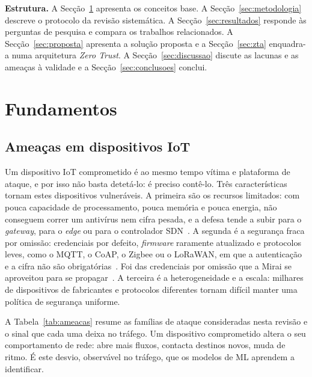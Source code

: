\documentclass[conference,a4paper]{IEEEtran}
\begin{document}
\textbf{Estrutura.} A Secção~\ref{sec:fundamentos} apresenta os conceitos base.
A Secção~\ref{sec:metodologia} descreve o protocolo da revisão sistemática.
A Secção~\ref{sec:resultados} responde às perguntas de pesquisa e compara os
trabalhos relacionados. A Secção~\ref{sec:proposta} apresenta a solução proposta e a
Secção~\ref{sec:zta} enquadra-a numa arquitetura \textit{Zero Trust}. A
Secção~\ref{sec:discussao} discute as lacunas e as ameaças à validade e a
Secção~\ref{sec:conclusoes} conclui.

\section{Fundamentos}\label{sec:fundamentos}
\subsection{Ameaças em dispositivos IoT}
Um dispositivo IoT comprometido é ao mesmo tempo vítima e plataforma de ataque, e por isso
não basta detetá-lo: é preciso contê-lo. Três características tornam estes dispositivos
vulneráveis. A primeira são os recursos limitados: com pouca capacidade de processamento, pouca
memória e pouca energia, não conseguem correr um antivírus nem cifra pesada, e a defesa tende a subir para o
\textit{gateway}, para o \textit{edge} ou para o controlador SDN~\cite{kponyo2020lightweight}.
A segunda é a segurança fraca por omissão: credenciais por defeito, \textit{firmware}
raramente atualizado e protocolos leves, como o MQTT, o CoAP, o Zigbee ou o LoRaWAN, em que
a autenticação e a cifra não são obrigatórias~\cite{mqtt5,rfc7252}. Foi das credenciais
por omissão que a Mirai se aproveitou para se propagar~\cite{antonakakis2017mirai}. A
terceira é a heterogeneidade e a escala: milhares de dispositivos de fabricantes e
protocolos diferentes tornam difícil manter uma política de segurança uniforme.

A Tabela~\ref{tab:ameacas} resume as famílias de ataque consideradas nesta revisão e o
sinal que cada uma deixa no tráfego. Um dispositivo comprometido altera o seu
comportamento de rede: abre mais fluxos, contacta destinos novos, muda de ritmo. É este
desvio, observável no tráfego, que os modelos de ML aprendem a identificar.
\end{document}
